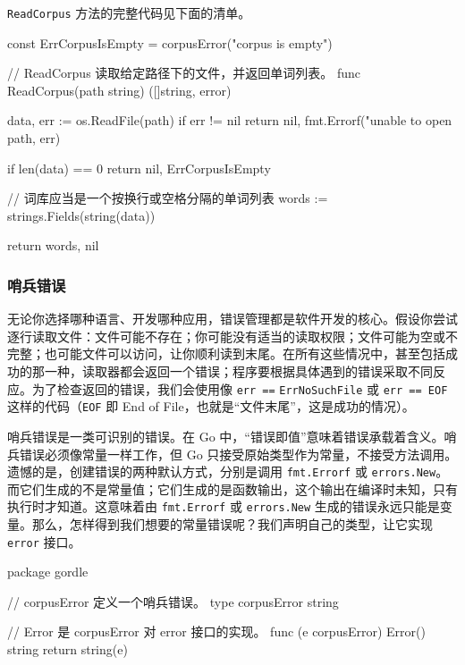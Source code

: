\texttt{ReadCorpus} 方法的完整代码见下面的清单。

\begin{gocode}[title={代码清单 5.32 corpus.go：\texttt{ReadCorpus} 方法}]
const ErrCorpusIsEmpty = corpusError("corpus is empty")

// ReadCorpus 读取给定路径下的文件，并返回单词列表。
func ReadCorpus(path string) ([]string, error) {
    data, err := os.ReadFile(path)
    if err != nil {
        return nil, fmt.Errorf("unable to open %
            path, err)
    }

    if len(data) == 0 {
        return nil, ErrCorpusIsEmpty
    }

    // 词库应当是一个按换行或空格分隔的单词列表
    words := strings.Fields(string(data))

    return words, nil
}
\end{gocode}

\subsubsection*{哨兵错误}

无论你选择哪种语言、开发哪种应用，错误管理都是软件开发的核心。假设你尝试逐行读取文件：文件可能不存在；你可能没有适当的读取权限；文件可能为空或不完整；也可能文件可以访问，让你顺利读到末尾。在所有这些情况中，甚至包括成功的那一种，读取器都会返回一个错误；程序要根据具体遇到的错误采取不同反应。为了检查返回的错误，我们会使用像 \texttt{err ==}
\texttt{ErrNoSuchFile} 或 \texttt{err == EOF} 这样的代码（\texttt{EOF} 即 End of File，也就是“文件末尾”，这是成功的情况）。

哨兵错误是一类可识别的错误。在 Go 中，“错误即值”意味着错误承载着含义。哨兵错误必须像常量一样工作，但 Go 只接受原始类型作为常量，不接受方法调用。遗憾的是，创建错误的两种默认方式，分别是调用 \texttt{fmt.Errorf} 或 \texttt{errors.New}。而它们生成的不是常量值；它们生成的是函数输出，这个输出在编译时未知，只有执行时才知道。这意味着由 \texttt{fmt.Errorf} 或 \texttt{errors.New} 生成的错误永远只能是变量。那么，怎样得到我们想要的常量错误呢？我们声明自己的类型，让它实现 \texttt{error} 接口。

\begin{gocode}[title={代码清单 5.33 errors.go：哨兵错误 \texttt{corpusError}}]
package gordle

// corpusError 定义一个哨兵错误。
type corpusError string

// Error 是 corpusError 对 error 接口的实现。
func (e corpusError) Error() string {
    return string(e)
}
\end{gocode}

